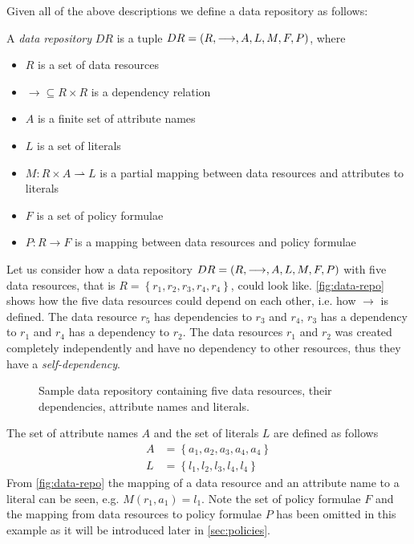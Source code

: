 Given all of the above descriptions we define a data repository as follows:
\begin{definition}
A \emph{data repository} $DR$ is a tuple $DR= \left( R, \longrightarrow, A, L, M, F, P \right)$, where
\begin{itemize}
  \item $R$ is a set of data resources
  \item $\longrightarrow \subseteq R \times R$ is a dependency relation
  \item $A$ is a finite set of attribute names
  \item $L$ is a set of literals
  \item $M : R \times A \rightharpoonup L$ is a partial mapping between data resources and attributes to literals
  \item $F$ is a set of policy formulae
  \item $P : R \rightarrow F$ is a mapping between data resources and policy formulae
\end{itemize}
\end{definition}

\begin{example}\label{ex:data-repo}
Let us consider how a data repository $DR= \left( R, \longrightarrow, A, L, M, F, P \right)$ with five data resources, that is $R = \left\{ r_1, r_2, r_3, r_4, r_4 \right\}$, could look like. \autoref{fig:data-repo} shows how the five data resources could depend on each other, i.e. how $\longrightarrow$ is defined. The data resource $r_5$ has dependencies to $r_3$ and $r_4$, $r_3$ has a dependency to $r_1$ and $r_4$ has a dependency to $r_2$. The data resources $r_1$ and $r_2$ was created completely independently and have no dependency to other resources, thus they have a \emph{self-dependency}.
\begin{figure}[!ht] 
    \begin{center}
        
        \caption{Sample data repository containing five data resources, their dependencies, attribute names and literals.}
        \label{fig:data-repo}
    \end{center}
\end{figure}
The set of attribute names $A$ and the set of literals $L$ are defined as follows
\begin{align*}
    A &= \left\{ a_1, a_2, a_3, a_4, a_4 \right\} \\
    L &= \left\{ l_1, l_2, l_3, l_4, l_4 \right\}
\end{align*}
From \autoref{fig:data-repo} the mapping of a data resource and an attribute name to a literal can be seen, e.g. $M(r_1, a_1) = l_1$. Note the set of policy formulae $F$ and the mapping from data resources to policy formulae $P$ has been omitted in this example as it will be introduced later in \autoref{sec:policies}.
\end{example}

